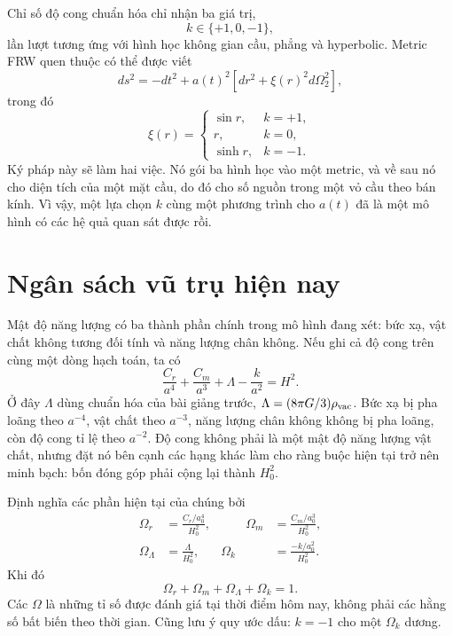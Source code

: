Chỉ số độ cong chuẩn hóa chỉ nhận ba giá trị,
\begin{equation}
k\in\{+1,0,-1\},
\end{equation}
lần lượt tương ứng với hình học không gian cầu, phẳng và hyperbolic. Metric FRW quen thuộc có thể được viết
\begin{equation}
ds^2=-dt^2+a(t)^2\left[dr^2+\xi(r)^2d\Omega_2^2\right],
\label{eq:c06-frw}
\end{equation}
trong đó
\begin{equation}
\xi(r)=
\begin{cases}
\sin r, & k=+1,\\
r, & k=0,\\
\sinh r, & k=-1.
\end{cases}
\label{eq:c06-xi}
\end{equation}
Ký pháp này sẽ làm hai việc. Nó gói ba hình học vào một metric, và về sau nó cho diện tích của một mặt cầu, do đó cho số nguồn trong một vỏ cầu theo bán kính. Vì vậy, một lựa chọn \(k\) cùng một phương trình cho \(a(t)\) đã là một mô hình có các hệ quả quan sát được rồi.

\section{Ngân sách vũ trụ hiện nay}

Mật độ năng lượng có ba thành phần chính trong mô hình đang xét: bức xạ, vật chất không tương đối tính và năng lượng chân không. Nếu ghi cả độ cong trên cùng một dòng hạch toán, ta có
\begin{equation}
\frac{C_r}{a^4}
+\frac{C_m}{a^3}
+\Lambda
-\frac{k}{a^2}
=H^2.
\label{eq:c06-budget}
\end{equation}
Ở đây \(\Lambda\) dùng chuẩn hóa của bài giảng trước, \(\Lambda=(8\pi G/3)\rho_{\rm vac}\). Bức xạ bị pha loãng theo \(a^{-4}\), vật chất theo \(a^{-3}\), năng lượng chân không không bị pha loãng, còn độ cong tỉ lệ theo \(a^{-2}\). Độ cong không phải là một mật độ năng lượng vật chất, nhưng đặt nó bên cạnh các hạng khác làm cho ràng buộc hiện tại trở nên minh bạch: bốn đóng góp phải cộng lại thành \(H_0^2\).

Định nghĩa các phần hiện tại của chúng bởi
\begin{equation}
\begin{aligned}
\Omega_r&=\frac{C_r/a_0^4}{H_0^2},
&\qquad
\Omega_m&=\frac{C_m/a_0^3}{H_0^2},\\
\Omega_\Lambda&=\frac{\Lambda}{H_0^2},
&
\Omega_k&=\frac{-k/a_0^2}{H_0^2}.
\end{aligned}
\label{eq:c06-omegas}
\end{equation}
Khi đó
\begin{equation}
\boxed{\Omega_r+\Omega_m+\Omega_\Lambda+\Omega_k=1.}
\label{eq:c06-sum-rule}
\end{equation}
Các \(\Omega\) là những tỉ số được đánh giá tại thời điểm hôm nay, không phải các hằng số bất biến theo thời gian. Cũng lưu ý quy ước dấu: \(k=-1\) cho một \(\Omega_k\) dương.

